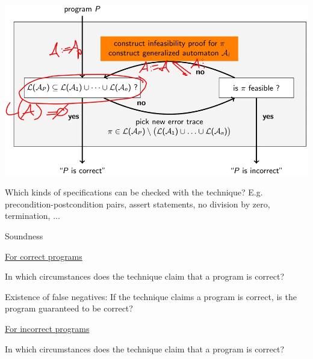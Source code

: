 \documentclass[a4paper]{article}
\begin{document}
\begin{minipage}[t]{0.16\linewidth}
\begin{betterlist}
{{\begin{betterlist}
					\includegraphics[width=\linewidth]{./figures/trace_abstraction_refinement.png}
				\end{betterlist}
			}}
		\item Which kinds of specifications can be checked with the technique? E.g. precondition-postcondition pairs, assert statements, no division by zero, termination, ...

		\item \alert{Soundness}
		\begin{betterlist}
			\item \underline{For correct programs}
			\begin{betterlist}
				\item In which circumstances does the technique claim that a program is correct?

				\item Existence of false negatives: If the technique claims a program is correct, is the program guaranteed to be correct?

			\end{betterlist}
			\item \underline{For incorrect programs}
			\begin{betterlist}
				\item In which circumstances does the technique claim that a program is correct?


\end{betterlist}
\end{betterlist}
\end{betterlist}
\end{minipage}
\end{document}
